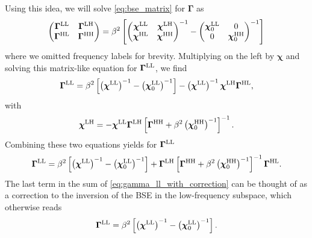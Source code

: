 \documentclass[\main/main.tex]{subfiles}
\begin{document}
Using this idea, we will solve \eqref{eq:bse_matrix} for $\bm\Gamma$ as
\begin{align}\label{eq:bse_block}
	\begin{pmatrix}
		\bm\Gamma^{\text{L}\text{L}} & \bm\Gamma^{\text{L}\text{H}} \\ \bm\Gamma^{\text{H}\text{L}} & \bm\Gamma^{\text{H}\text{H}}
	\end{pmatrix}=\beta^2\left [
	\begin{pmatrix}
		\bm\chi^{\text{L}\text{L}} & \bm\chi^{\text{L}\text{H}} \\ \bm\chi^{\text{H}\text{L}} & \bm\chi^{\text{H}\text{H}}
	\end{pmatrix}^{-1}-
	\begin{pmatrix}
		\bm\chi_{0}^{\text{L}\text{L}} & 0 \\ 0 & \bm\chi_{0}^{\text{H}\text{H}}
	\end{pmatrix}^{-1}\right ]
\end{align}
where we omitted frequency labels for brevity. Multiplying on the left by $\bm\chi$ and solving this matrix-like equation for $\bm\Gamma^{\text{L}\text{L}}$, we find
\begin{align}\label{eq:gamma_ll_with_correction_but_generalized_susc}
	\bm\Gamma^{\text{L}\text{L}}=\beta^2\left[\left (\bm\chi^{\text{L}\text{L}}\right )^{-1}-\left (\bm\chi_{0}^{\text{L}\text{L}}\right )^{-1}\right ]-\left (\bm\chi^{\text{L}\text{L}}\right )^{-1}\bm\chi^{\text{L}\text{H}}\bm\Gamma^{\text{H}\text{L}},
\end{align}
with
\begin{align}
	\bm\chi^{\text{L}\text{H}}=-\bm\chi^{\text{L}\text{L}}\bm\Gamma^{\text{L}\text{H}}\left [\bm\Gamma^{\text{H}\text{H}}+\beta^2 \left (\bm\chi_{0}^{\text{H}\text{H}}\right )^{-1}\right ]^{-1}.
\end{align}
Combining these two equations yields for $\bm\Gamma^{\text{L}\text{L}}$
\begin{align}\label{eq:gamma_ll_with_correction}
	\bm\Gamma^{\text{L}\text{L}}=\beta^2\left[\left (\bm\chi^{\text{L}\text{L}}\right )^{-1}-\left (\bm\chi_{0}^{\text{L}\text{L}}\right )^{-1}\right ]+\bm\Gamma^{\text{L}\text{H}}\left [\bm\Gamma^{\text{H}\text{H}}+\beta^2 \left (\bm\chi_{0}^{\text{H}\text{H}}\right )^{-1}\right ]^{-1}\bm\Gamma^{\text{H}\text{L}}.
\end{align}
The last term in the sum of \eqref{eq:gamma_ll_with_correction} can be thought of as a correction to the inversion of the BSE in the low-frequency subspace, which otherwise reads
\begin{align}
	\bm\Gamma^{\text{L}\text{L}}=\beta^2\left[\left (\bm\chi^{\text{L}\text{L}}\right )^{-1}-\left (\bm\chi_{0}^{\text{L}\text{L}}\right )^{-1}\right ].
\end{align}
\end{document}
